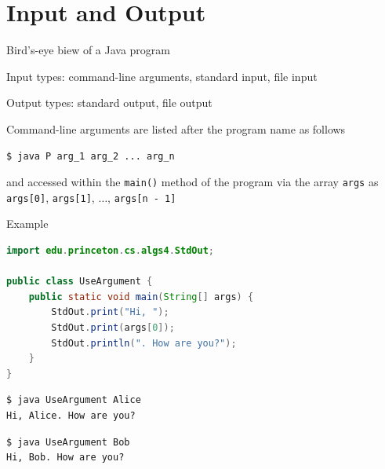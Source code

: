 \documentclass[8pt,a4paper,compress]{beamer}
\begin{document}
\section{Input and Output}
\begin{frame}[fragile]
\pause

Bird's-eye biew of a Java program
\begin{center}
\end{center}

\pause\bigskip

Input types: command-line arguments, standard input, file input

\pause\bigskip

Output types: standard output, file output

\pause\bigskip

Command-line arguments are listed after the program name as follows

\smallskip

\begin{lstlisting}[language={},style=focusin]
$ java P arg_1 arg_2 ... arg_n
\end{lstlisting}

\smallskip

and accessed within the \lstinline$main()$ method of the program via the array \lstinline$args$  as \lstinline$args[0]$, \lstinline$args[1]$, $\dots$, \lstinline$args[n - 1]$

\pause\bigskip

Example

\smallskip

\begin{lstlisting}[language=Java,style=focusin]
import edu.princeton.cs.algs4.StdOut;

public class UseArgument {
    public static void main(String[] args) {
        StdOut.print("Hi, ");
        StdOut.print(args[0]);
        StdOut.println(". How are you?");
    }
}
\end{lstlisting}

\pause\bigskip

\begin{lstlisting}[language={},style=focusin]
$ java UseArgument Alice
Hi, Alice. How are you?
\end{lstlisting}

\pause\bigskip

\begin{lstlisting}[language={},style=focusin]
$ java UseArgument Bob
Hi, Bob. How are you?
\end{lstlisting}
\end{frame}
\end{document}
